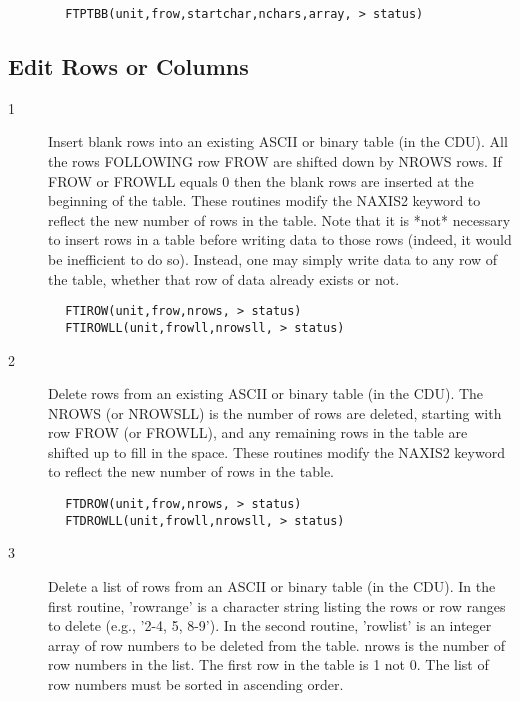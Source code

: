 \documentclass[11pt]{book}
\begin{document}
\begin{verbatim}
        FTPTBB(unit,frow,startchar,nchars,array, > status)
\end{verbatim}


\subsection{Edit Rows or Columns \label{FTIROW}}


\begin{description}
\item[1 ] Insert blank rows into an existing ASCII or binary table (in the CDU).
    All the rows FOLLOWING row FROW are shifted down by NROWS rows.  If
    FROW or FROWLL equals 0 then the blank rows are inserted at the beginning of the
    table.  These routines modify the NAXIS2 keyword to reflect the new
    number of rows in the table.  Note that it is *not* necessary to insert rows in a table before
    writing data to those rows (indeed, it would be inefficient to do so).
    Instead, one may simply write data to any row of the table, whether that
   row of data already exists or not.
\end{description}

\begin{verbatim}
        FTIROW(unit,frow,nrows, > status)
        FTIROWLL(unit,frowll,nrowsll, > status)
\end{verbatim}

\begin{description}
\item[2 ] Delete rows from an existing ASCII or binary table (in the CDU).
    The NROWS (or NROWSLL) is the number of rows are deleted, starting
    with row FROW (or FROWLL), and
    any remaining rows in the table are shifted up to fill in the space.
    These routines modify the NAXIS2 keyword to reflect the new number
   of rows in the table.
\end{description}

\begin{verbatim}
        FTDROW(unit,frow,nrows, > status)
        FTDROWLL(unit,frowll,nrowsll, > status)
\end{verbatim}

\begin{description}
\item[3 ] Delete a list of rows from an ASCII or binary table (in the CDU).
    In the first routine, 'rowrange' is a character string listing the
    rows or row ranges to delete (e.g., '2-4, 5, 8-9'). In the second
    routine, 'rowlist' is an integer array of row numbers to be deleted
    from the table.  nrows is the number of row numbers in the list.
    The first row in the table is 1 not 0.  The list of row numbers
   must be sorted in ascending order.
\end{description}
\end{document}
